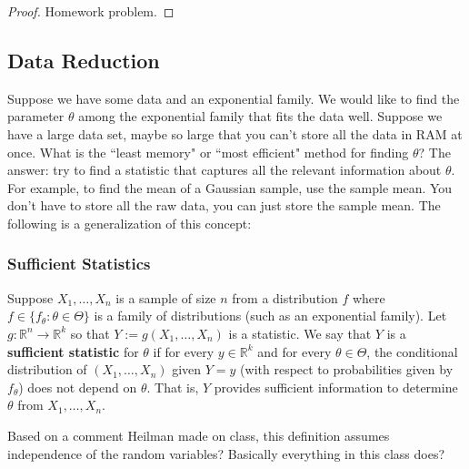 \begin{proof} Homework problem.

\end{proof}

\subsection{Data Reduction}

Suppose we have some data and an exponential family. We would like to find the parameter \(\theta\) among the exponential family that fits the data well. Suppose we have a large data set, maybe so large that you can't store all the data in RAM at once. What is the ``least memory" or ``most efficient" method for finding \(\theta\)? The answer: try to find a statistic that captures all the relevant information about \(\theta\). For example, to find the mean of a Gaussian sample, use the sample mean. You don't have to store all the raw data, you can just store the sample mean. The following is a generalization of this concept:

\subsubsection{Sufficient Statistics}

\begin{definition} Suppose \(X_1, \ldots, X_n\) is a sample of size \(n\) from a distribution \(f\) where \(f \in \{f_\theta: \theta \in \Theta \}\) is a family of distributions (such as an exponential family). Let \(g: \mathbb{R}^n \to \mathbb{R}^k\) so that \(Y:= g(X_1, \ldots, X_n) \) is a statistic. We say that \(Y\) is a \textbf{sufficient statistic} for \(\theta\) if for every \(y \in \mathbb{R}^k\) and for every \(\theta \in \Theta\), the conditional distribution of \((X_1, \ldots, X_n)\) given \(Y=y\) (with respect to probabilities given by \(f_\theta\)) does not depend on \(\theta\). That is, \(Y\) provides sufficient information to determine \(\theta\) from \(X_1, \ldots, X_n\).

\end{definition}

\begin{remark} Based on a comment Heilman made on class, this definition assumes independence of the random variables? Basically everything in this class does?

\end{remark}

